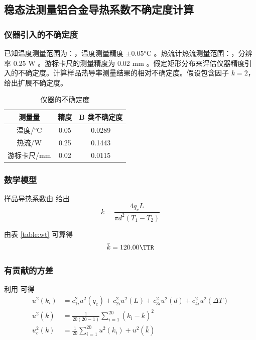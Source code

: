 \documentclass[a4paper,utf8]{article}
\begin{document}
\subsection{稳态法测量铝合金导热系数不确定度计算}
\subsubsection{仪器引入的不确定度}
已知温度测量范围为：，温度测量精度 $\pm 0.05 \unit{\degreeCelsius}$ 。热流计热流测量范围：\linebreak {}，分辨率 0.25 \unit{\watt} 。游标卡尺的测量精度为 0.02 \unit{\mm} 。假定矩形分布来评估仪器精度引入的不确定度。计算样品热导率测量结果的相对不确定度。假设包含因子 $k=2$，给出扩展不确定度。
\begin{table}[!ht]
    \caption{仪器的不确定度}
    \begin{tabularx}{0.7\textwidth}{*{3}{C}}\toprule
        测量量 & 精度 & B 类不确定度 \\ \midrule
        温度/\unit{\degreeCelsius} & 0.05 & 0.0289 \\
        热流/\unit{\W} & 0.25 & 0.1443 \\
        游标卡尺/\unit{\mm} & 0.02 & 0.0115 \\ \bottomrule
    \end{tabularx}
\end{table}
\subsubsection{数学模型}
    样品导热系数由 给出
    \begin{equation}
        k=\frac{4q_c L}{\pi d^2(T_1-T_2)} \label{eq:4}
    \end{equation}\par
    由表 \ref{table:wt} 可算得
    \begin{equation}
        \bar{k}=120.00 \unit{\TTR}
    \end{equation}
\subsubsection{有贡献的方差}
利用 可得
\begin{align}
    u^2(k_i)&=c_{1i}^2u^2(q_c)+c_{2i}^2u^2(L)+c_{3i}^2u^2(d)+c_{4i}^2u^2(\Delta T) \\
    u^2(\bar{k})&=\frac{1}{20(20-1)}\sum_{i=1}^{20}(k_i-\bar{k})^2 \\ 
    u_c^2(k)&=\frac{1}{20}\sum_{i=1}^{20}u^2(k_i)+u^2(\bar{k}) \label{eq:5}
\end{align}
\end{document}
